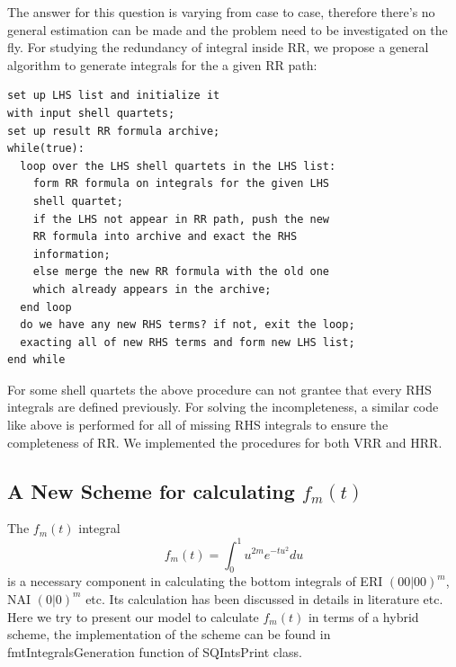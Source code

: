 The answer for this question is varying from case to case, therefore there's 
no general estimation can be made and the problem need to be investigated 
on the fly. For studying the redundancy of integral inside RR, we propose
a general algorithm to generate integrals for the a given RR path:
\begin{verbatim}
set up LHS list and initialize it
with input shell quartets;
set up result RR formula archive;
while(true):
  loop over the LHS shell quartets in the LHS list:
    form RR formula on integrals for the given LHS 
    shell quartet;
    if the LHS not appear in RR path, push the new 
    RR formula into archive and exact the RHS 
    information;
    else merge the new RR formula with the old one
    which already appears in the archive;
  end loop
  do we have any new RHS terms? if not, exit the loop;
  exacting all of new RHS terms and form new LHS list;
end while
\end{verbatim}
For some shell quartets the above procedure can not grantee that every
RHS integrals are defined previously. For solving the incompleteness,
a similar code like above is performed for all of missing RHS integrals
to ensure the completeness of RR. We implemented the procedures for 
both VRR and HRR.

\subsection{A New Scheme for calculating $f_{m}(t)$}
\label{fmt}

The $f_{m}(t)$ integral
\begin{equation}\label{fm_ssssm_fmt_eq:1}
 f_{m}(t) = \int^{1}_{0} u^{2m} e^{-tu^{2}} du 
\end{equation}
is a necessary component in calculating the bottom integrals of ERI $(00|00)^{m}$,
NAI $(0|0)^{m}$ etc. Its calculation has been discussed in details in literature
\cite{harris1983sssm, gill1991two} etc. Here we try to present our model to calculate
$f_{m}(t)$ in terms of a hybrid scheme, the implementation of the scheme can be 
found in fmtIntegralsGeneration function of SQIntsPrint class.

